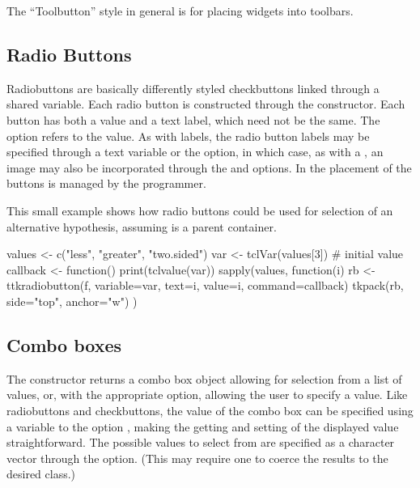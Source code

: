 The ``Toolbutton'' style in general is for placing widgets into toolbars.

\subsection{Radio Buttons}
\label{sec:tcltk:radio-buttons}

Radiobuttons are basically differently styled checkbuttons linked through a shared \TCL\/
variable. Each radio button is constructed through the
 constructor. Each button has both a value and
a text label, which need not be the same. The
 option refers to the
value. As with labels, the radio button labels may be specified
through a text variable or the  option,
in which case, as with a , an image may also be
incorporated through the  and
 options. In \TK\/ the placement of
the buttons is managed by the programmer.


This small example shows how radio buttons could be used for selection
of an alternative hypothesis, assuming  is a parent container.

\begin{Schunk}
\begin{Sinput}
 values <- c("less", "greater", "two.sided")
 var <- tclVar(values[3])                # initial value
 callback <- function() print(tclvalue(var))
 sapply(values, function(i) {
   rb <- ttkradiobutton(f, variable=var, 
                        text=i, value=i, 
                        command=callback)
   tkpack(rb, side="top", anchor="w")
 })
\end{Sinput}
\end{Schunk}


\subsection{Combo boxes}
\label{sec:tcltk:comboboxes}

The  constructor returns a combo box object
allowing for
selection from a list of values, or, with the appropriate option, allowing
the user to specify a value. Like radiobuttons and checkbuttons, the
value of the combo box can be specified using a \TCL\/ variable to the
option , making the getting and
setting of the displayed value straightforward. The possible values to
select from are specified as a character vector through the
 option. (This may require one to coerce
the results to the desired class.)

